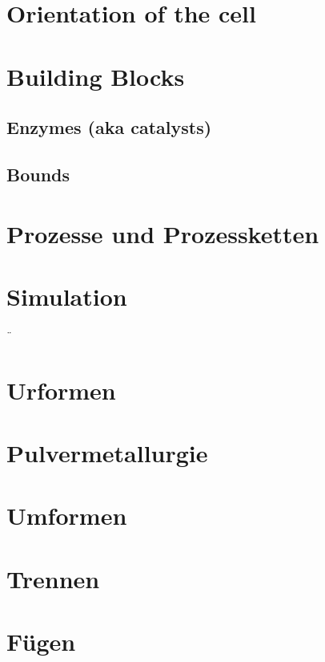 \documentclass[12pt]{cheatsheet}
\author{Gian Maria Ernst - ernstg\\  \vspace*{0.2em} \vspace*{-0.2em}}\doctitle{Bioengineering}
\begin{document}
\small


\section*{Orientation of the cell}


\section*{Building Blocks}

\subsection*{Enzymes (aka catalysts)}

\vfill \null \columnbreak

\subsection*{Bounds}

\section*{Prozesse und Prozessketten}

\section*{Simulation}
¨
\section*{Urformen}

\section*{Pulvermetallurgie}

\section*{Umformen}

\section*{Trennen}

\section*{Fügen}
\end{document}

